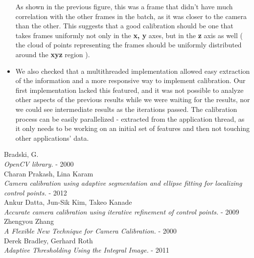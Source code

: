 \documentclass[journal]{IEEEtran}
\begin{document}
\begin{itemize}
    As shown in the previous figure, this was a frame that didn't have much correlation with the other frames in the batch, as it was closer to the camera than the other. This suggests that a good calibration should be one that takes frames uniformly not only in the \textbf{x, y} axes, but in the \textbf{z} axis as well ( the cloud of points representing the frames should be uniformly distributed around the \textbf{xyz} region ).

    \item We also checked that a multithreaded implementation allowed easy extraction of the information and a more responsive way to implement calibration. Our first implementation lacked this featured, and it was not possible to analyze other aspects of the previous results while we were waiting for the results, nor we could see intermediate results as the iterations passed. The calibration process can be easily parallelized - extracted from the application thread, as it only needs to be working on an initial set of features and then not touching other applications' data.

\end{itemize}


\begin{thebibliography}{1}

  Bradski, G. \\
  \textit{OpenCV library.} - 2000
\\
  Charan Prakash, Lina Karam\\
  \textit{Camera calibration using adaptive segmentation and ellipse fitting for localizing control points.} - 2012
\\
  Ankur Datta, Jun-Sik Kim, Takeo Kanade\\
  \textit{Accurate camera calibration using iterative refinement of control points.} - 2009
\\
  Zhengyou Zhang \\
  \textit{A Flexible New Technique for Camera Calibration.} - 2000
\\
  Derek Bradley, Gerhard Roth \\
  \textit{Adaptive Thresholding Using the Integral Image.} - 2011

\end{thebibliography}
\end{document}

